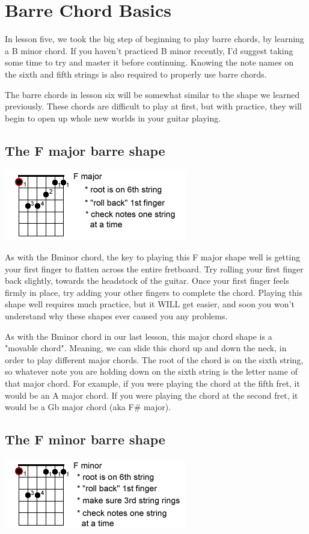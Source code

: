 \section{Barre Chord Basics}
In lesson five, we took the big step of beginning to play barre chords, by learning a B minor chord. If you haven't practiced B minor recently, I'd suggest taking some time to try and master it before continuing. Knowing the note names on the sixth and fifth strings is also required to properly use barre chords.

The barre chords in lesson six will be somewhat similar to the shape we learned previously. These chords are difficult to play at first, but with practice, they will begin to open up whole new worlds in your guitar playing. 

\subsection{The F major barre shape}
\includegraphics{partsix/fmajorbarre.png}

As with the Bminor chord, the key to playing this F major shape well is getting your first finger to flatten across the entire fretboard. Try rolling your first finger back slightly, towards the headstock of the guitar. Once your first finger feels firmly in place, try adding your other fingers to complete the chord. Playing this shape well requires much practice, but it WILL get easier, and soon you won't understand why these shapes ever caused you any problems.

As with the Bminor chord in our last lesson, this major chord shape is a "movable chord". Meaning, we can slide this chord up and down the neck, in order to play different major chords. The root of the chord is on the sixth string, so whatever note you are holding down on the sixth string is the letter name of that major chord. For example, if you were playing the chord at the fifth fret, it would be an A major chord. If you were playing the chord at the second fret, it would be a Gb major chord (aka F\# major). 

\subsection{The F minor barre shape}
\includegraphics{partsix/fminorbarre.png}

